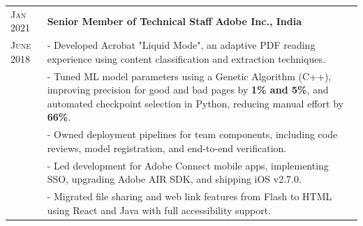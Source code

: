 \documentclass[a4paper,10pt]{extarticle}
\begin{document}
\begin{tabularx}{\linewidth}{ l | X }

\textsc{Jan 2021} & \textbf{Senior Member of Technical Staff} \hfill \textbf{Adobe Inc., India} \\
\textsc{June 2018} & \small{- Developed Acrobat "Liquid Mode", an adaptive PDF reading experience using content classification and extraction techniques.} \\
& \small{- Tuned ML model parameters using a Genetic Algorithm (C++), improving precision for good and bad pages by \textbf{1\% and 5\%}, and automated checkpoint selection in Python, reducing manual effort by \textbf{66\%}.} \\
& \small{- Owned deployment pipelines for team components, including code reviews, model registration, and end-to-end verification.} \\
& \small{- Led development for Adobe Connect mobile apps, implementing SSO, upgrading Adobe AIR SDK, and shipping iOS v2.7.0.} \\
& \small{- Migrated file sharing and web link features from Flash to HTML using React and Java with full accessibility support.} \\



\end{tabularx}
\end{document}
